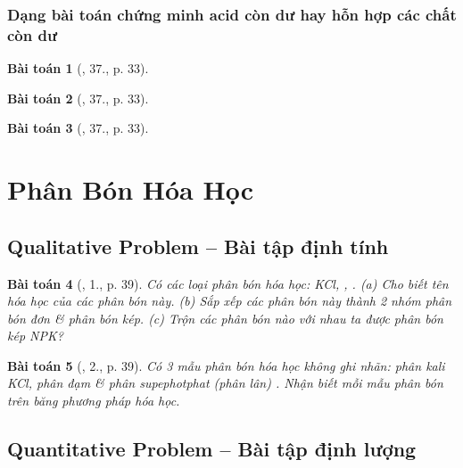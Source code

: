 \documentclass{article}
\newtheorem{baitoan}{Bài toán}
\begin{document}
\subsubsection{Dạng bài toán chứng minh acid còn dư hay hỗn hợp các chất còn dư}

\begin{baitoan}[\cite{An_350_BT_Hoa_Hoc_9}, 37., p. 33]
	
\end{baitoan}

\begin{baitoan}[\cite{An_350_BT_Hoa_Hoc_9}, 37., p. 33]
	
\end{baitoan}

\begin{baitoan}[\cite{An_350_BT_Hoa_Hoc_9}, 37., p. 33]
	
\end{baitoan}


\section{Phân Bón Hóa Học}

\subsection{Qualitative Problem -- Bài tập định tính}

\begin{baitoan}[\cite{SGK_Hoa_Hoc_9}, 1., p. 39]
	Có các loại phân bón hóa học: \emph{KCl, , }. (a) Cho biết tên hóa học của các phân bón này. (b) Sắp xếp các phân bón này thành 2 nhóm phân bón đơn \& phân bón kép. (c) Trộn các phân bón nào với nhau ta được phân bón kép NPK?
\end{baitoan}

\begin{baitoan}[\cite{SGK_Hoa_Hoc_9}, 2., p. 39]
	Có 3 mẫu phân bón hóa học không ghi nhãn: phân kali \emph{KCl}, phân đạm \emph{} \& phân supephotphat (phân lân) \emph{}. Nhận biết mỗi mẫu phân bón trên băng phương pháp hóa học.
\end{baitoan}

\subsection{Quantitative Problem -- Bài tập định lượng}
\end{document}
